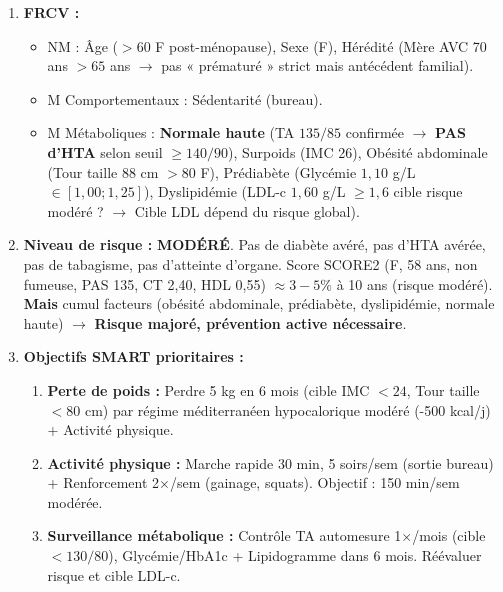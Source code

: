 \documentclass[11pt]{article}
\begin{document}
\begin{corrige}[Exercice 2]
\begin{enumerate}
    \item \textbf{FRCV :}
    \begin{itemize}
        \item NM : Âge ($>60$ F post-ménopause), Sexe (F), Hérédité (Mère AVC 70 ans $>65$ ans $\rightarrow$ pas « prématuré » strict mais antécédent familial).
        \item M Comportementaux : Sédentarité (bureau).
        \item M Métaboliques : \textbf{Normale haute} (TA $135/85$ confirmée $\rightarrow$ \textbf{PAS d'HTA} selon seuil $\ge 140/90$), Surpoids (IMC 26), Obésité abdominale (Tour taille 88 cm $> 80$ F), Prédiabète (Glycémie $1,10$ g/L $\in [1,00 ; 1,25]$), Dyslipidémie (LDL-c $1,60$ g/L $\ge 1,6$ cible risque modéré ? $\rightarrow$ Cible LDL dépend du risque global).
    \end{itemize}
    \item \textbf{Niveau de risque :} \textbf{MODÉRÉ}. Pas de diabète avéré, pas d'HTA avérée, pas de tabagisme, pas d'atteinte d'organe. Score SCORE2 (F, 58 ans, non fumeuse, PAS 135, CT 2,40, HDL 0,55) $\approx 3-5\%$ à 10 ans (risque modéré). \textbf{Mais} cumul facteurs (obésité abdominale, prédiabète, dyslipidémie, normale haute) $\rightarrow$ \textbf{Risque majoré, prévention active nécessaire}.
    \item \textbf{Objectifs SMART prioritaires :}
    \begin{enumerate}
        \item \textbf{Perte de poids :} Perdre 5 kg en 6 mois (cible IMC $< 24$, Tour taille $< 80$ cm) par régime méditerranéen hypocalorique modéré (-500 kcal/j) + Activité physique.
        \item \textbf{Activité physique :} Marche rapide 30 min, 5 soirs/sem (sortie bureau) + Renforcement 2$\times$/sem (gainage, squats). Objectif : 150 min/sem modérée.
        \item \textbf{Surveillance métabolique :} Contrôle TA automesure 1$\times$/mois (cible $< 130/80$), Glycémie/HbA1c + Lipidogramme dans 6 mois. Réévaluer risque et cible LDL-c.
    \end{enumerate}
\end{enumerate}
\end{corrige}
\end{document}
